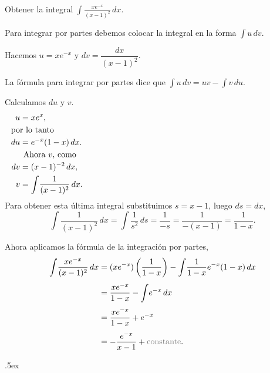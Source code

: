 \documentclass[12pt,letterpaper]{article}
\author{\textsc{Manuel López Mateos}}
\newcommand{\fej}{\relax\hfill\ifmmode{\lower.5ex\hbox{{\textcolor{blue}{\LARGE\smiley al 15pt}}}}\else\lower.5ex\hbox{{\textcolor{blue}{\LARGE \smiley}}}}  %
\begin{document}
Obtener la integral $\displaystyle\int\!\frac{xe^{-x}}{(x-1)^2}\,dx$.

\smallskip
Para integrar por partes debemos colocar la integral en la forma $\displaystyle\int\!\! u\,dv$.

Hacemos $u=xe^{-x}$ y $dv=\dfrac{dx}{(x-1)^2}$.

La fórmula para integrar por partes dice que $\displaystyle\int\!\!u\,dv=uv-\int\!\!v\,du$.

Calculamos $du$ y $v$.
\begin{align*}
u&=xe^{x},\\
\noalign{\noindent\text{por lo tanto}}
du&=e^{-x}(1-x)\,dx.\\
\noalign{\text{Ahora $v$, como}}
dv&=(x-1)^{-2}\,dx,\\
v&=\int\!\frac{1}{(x-1)^2}\,dx.
\end{align*}
Para obtener esta última integral substituimos $s=x-1$, luego $ds=dx$,
$$\int\!\frac{1}{(x-1)^2}\,dx=\int\!\frac{1}{s^2}\,ds=\frac{1}{-s}=\frac{1}{-(x-1)}=\frac{1}{1-x}.$$

Ahora aplicamos la fórmula de la integración por partes,
\begin{align*}
\int\!\frac{xe^{-x}}{(x-1)^2}\,dx&=(xe^{-x})\left(\frac{1}{1-x}\right)-\int\!\frac{1}{1-x}e^{-x}(1-x)\,dx\\
\noalign{\smallskip}
&=\frac{xe^{-x}}{1-x}-\int\!e^{-x}\,dx\\
\noalign{\smallskip}
&=\frac{xe^{-x}}{1-x}+e^{-x}\\
\noalign{\smallskip}
&=-\frac{e^{-x}}{x-1}+\text{\textcolor{gray}{constante}}.
\end{align*}

\fej
\end{document}
